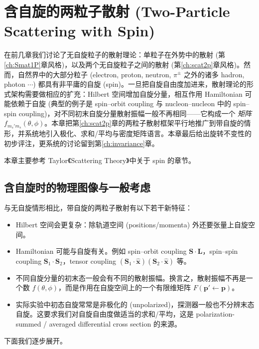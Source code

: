 \chapter{含自旋的两粒子散射 (Two-Particle Scattering with Spin)}\label{ch:spin2p}

在前几章我们讨论了无自旋粒子的散射理论：单粒子在外势中的散射 (第\ref{ch:Smat1P}章风格)，以及两个无自旋粒子之间的散射 (第\ref{ch:scat2p}章风格)。然而，自然界中的大部分粒子 (electron, proton, neutron, $\pi^\pm$ 之外的诸多 hadron, photon $\cdots$) 都具有非平庸的自旋 (spin)。一旦把自旋自由度加进来，散射理论的形式架构需要做相应的扩充：Hilbert 空间增加自旋分量，相互作用 Hamiltonian 可能依赖于自旋 (典型的例子是 spin--orbit coupling 与 nucleon--nucleon 中的 spin--spin coupling)，对不同初末自旋分量散射振幅一般不再相同——它构成一个 \emph{矩阵} $f_{m_s' m_s}(\theta,\phi)$。本章把第\ref{ch:scat2p}章的两粒子散射框架平行地推广到带自旋的情形，并系统地引入极化、求和/平均与密度矩阵语言。本章最后给出旋转不变性的初步评注，更系统的讨论留到第\ref{ch:invariance}章。

本章主要参考 Taylor《Scattering Theory》中关于 spin 的章节。

\section{含自旋时的物理图像与一般考虑}\label{sec:spin-overview}

与无自旋情形相比，带自旋的两粒子散射有以下若干新特征：
\begin{itemize}
  \item Hilbert 空间会更复杂：除轨道空间 (positions/momenta) 外还要张量上自旋空间。
  \item Hamiltonian 可能与自旋有关。例如 spin--orbit coupling $\bm S\cdot\bm L$，spin--spin coupling $\bm S_1\cdot\bm S_2$，tensor coupling $(\bm S_1\cdot\hat{\bm x})(\bm S_2\cdot\hat{\bm x})$ 等。
  \item 不同自旋分量的初末态一般会有不同的散射振幅。换言之，散射振幅不再是一个数 $f(\theta,\phi)$，而是作用在自旋空间上的一个有限维矩阵 $F(\bm p'\!\leftarrow\!\bm p)$。
  \item 实际实验中初态自旋常常是非极化的 (unpolarized)，探测器一般也不分辨末态自旋。这要求我们对自旋自由度做适当的求和/平均，这是 polarization-summed / averaged differential cross section 的来源。
\end{itemize}

下面我们逐步展开。

